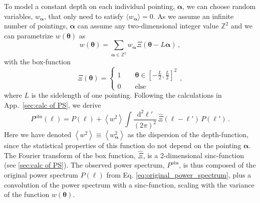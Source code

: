 \documentclass{aa}
\def\b#1{\bm{#1}}
\def\la{\left<}
\def\ra{\right>}
\begin{document}
To model a constant depth on each individual pointing, $\b \alpha$, we can choose random variables, $w_{\b \alpha}$, that only need to satisfy $\langle w_{\b \alpha}\rangle=0$. As we assume an infinite number of pointings, $\b\alpha$ can assume any two-dimensional integer value $\mathbb{Z}^2$ and we can parametrize $w(\b\theta)$ as 
\begin{equation}
w(\b \theta) = \sum_{\b \alpha \in \mathbb{Z}^2} w_{\b \alpha} \Xi(\b \theta-L\b \alpha)\, ,
\end{equation}
with the box-function
\begin{equation}
\Xi(\b \theta) = \begin{cases}
1 \qquad \b \theta\in \left[-\frac{L}{2},\frac{L}{2}\right]^2 \\
0 \qquad \text{else}
\end{cases},
\label{eq:defweightf}
\end{equation}
where $L$ is the sidelength of one pointing.
Following the calculations in App.~\ref{sec:calc of PS}, we derive 
\begin{equation}
P^{\text{obs}}(\b \ell)  =  P(\b \ell) + \la w^2\ra \int\frac{\text{d}^2\b \ell'}{(2\pi)^2}\,\hat{\Xi}(\b \ell-\b \ell')\, P(\b \ell')\, .
\end{equation}
Here we have denoted $\la w^2\ra \equiv \la w_{\b \alpha}^2\ra$ as the dispersion of the depth-function, since the statistical properties of this function do not depend on the pointing $\b\alpha$. The Fourier transform of the box function, $\hat{\Xi}$, is a 2-dimensional sinc-function (see \ref{sec:calc of PS}).
The observed power spectrum, $P^{\text{obs}}$, is thus composed of the original power spectrum $P(\ell)$ from Eq. \eqref{eq:original_power_spectrum}, plus a convolution of the power spectrum with a sinc-function, scaling with the variance of the function $w(\b\theta)$. 

\end{document}
